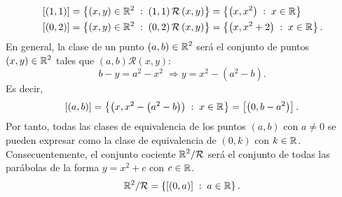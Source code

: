 \documentclass{article}
\begin{document}
\begin{sol}
\[\begin{split}
	 & \left[\left(1,1\right)\right] = \left \{ \left(x,y\right)\in \mathbb{R}^{2}\; : \; \left(1,1\right)\mathcal{R}\left(x,y\right)\right \} = \left \{ \left(x, x^{2}\right)\; : \; x\in \mathbb{R}\right \}\\
	 & \left[\left(0,2\right)\right] = \left \{ \left(x,y\right)\in \mathbb{R}^{2}\; : \; \left(0,2\right)\mathcal{R}\left(x,y\right)\right \} = \left \{ \left(x, x^{2}+2\right)\; : \; x\in \mathbb{R}\right \} .
	\end{split}
	\]
	En general, la clase de un punto $\displaystyle \left(a,b\right)\in\mathbb{R}^{2} $ será el conjunto de puntos $\displaystyle \left(x,y\right)\in\mathbb{R}^{2} $ tales que $\displaystyle \left(a,b\right)\mathcal{R} \left(x,y\right) $:
	\[b-y = a^{2}-x^{2} \; \Rightarrow y = x^{2} - \left(a^{2}-b\right) .\]
Es decir,
\[\left[\left(a,b\right)\right] = \left \{ \left(x,x^{2}-\left(a^{2}-b\right)\right) \; : \; x \in \mathbb{R}\right \} = \left[\left(0,b-a^{2}\right)\right]   .\]
Por tanto, todas las clases de equivalencia de los puntos $\displaystyle \left(a,b\right) $ con $\displaystyle a\neq0 $ se pueden expresar como la clase de equivalencia de $\displaystyle \left(0,k\right) $ con $\displaystyle k \in \mathbb{R} $. Consecuentemente, el conjunto cociente $\displaystyle \mathbb{R}^{2}/\mathcal{R} $ será el conjunto de todas las parábolas de la forma $\displaystyle y = x^{2}+c $ con $\displaystyle c\in\mathbb{R} $. 
\[\mathbb{R}^{2}/\mathcal{R} = \left \{ \left[\left(0,a\right)\right] \; : \; a \in \mathbb{R}\right \}  .\]
\end{sol}
\end{document}
